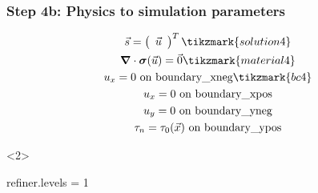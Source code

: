 \documentclass[aspectratio=169]{beamer}
\begin{document}
\begin{frame}[t,fragile]
  \frametitle{Step 4b: Physics to simulation parameters}
  \summary{}

  \begin{minipage}[t]{0.3\textwidth}
    {\scriptsize
    \begin{gather*}
        \vec{s} = \left(\begin{array}{c} \vec{u} \end{array}\right)^T \tikzmark{solution4}\\
        \tensor{\nabla} \cdot \tensor{\sigma}(\vec{u}) = \vec{0} \tikzmark{material4}\\
        u_x = 0 \text{ on boundary\_xneg} \tikzmark{bc4}\\
        u_x = 0 \text{ on boundary\_xpos} \\
        u_y = 0 \text{ on boundary\_yneg} \\
        \tau_n = \tau_0(\vec{x}) \text{ on boundary\_ypos}
    \end{gather*}}
  \end{minipage}
  \hfill
  \begin{minipage}[t]{0.67\textwidth}
    \begin{onlyenv}<2>
      \begin{cfgcode}
        refiner.levels = 1
      \end{cfgcode}
    \end{onlyenv}
  \end{minipage}

  
\end{frame}
\end{document}
